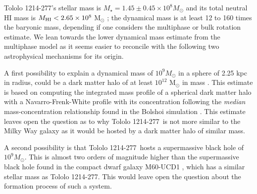 \documentclass[a4,useAMS,usenatbib,usegraphicx]{mn2e}
\newcommand{\tol}{Tololo 1214-277}
\newcommand{\kms}{km s$^{-1}$}
\begin{document}
\tol's stellar mass is  $M_{\star} = 1.45\pm0.45\times 10^{8}
M_{\odot}$   \citep{2014PASP..126.1079M} and its total neutral HI mass
is $M_{\rm HI}<2.65\times 10^{8}$ M$_{\odot}$ 
\citep{pustilnikmartin07}; the dynamical mass is at least 12 to 160 times
the baryonic mass, depending if one considers the multiphase or
bulk rotation estimate. 
We lean towards the lower dynamical mass estimate from the multiphase
model as it seems easier to reconcile with the following two
astrophysical mechanisms for its origin.

A first possibility to explain a dynamical mass of $10^{9} M_{\odot}$
in a sphere of 2.25 kpc in radius, could be a dark matter halo of at
least $10^{12}$ M$_{\odot}$ in mass \citep{2011ApJ...726..108T}.
This estimate is based on computing the integrated mass profile of a
spherical dark matter halo with a Navarro-Frenk-White profile with its
concentration following the \emph{median} mass-concentration
relationship found in the Bolshoi simulation
\citep{2012MNRAS.423.3018P}. 
This estimate leaves open the question as to why  \tol\ is not more
similar to the Milky Way galaxy as it would be hosted by a dark matter
halo of similar mass.

A second possibility is that \tol\ hosts a supermassive black hole of
$10^{9} M_{\odot}$. This is almost two orders of magnitude higher
than the supermassive black hole found in the compact dwarf galaxy
M60-UCD1 \citep{2014Natur.513..398S}, which has a similar stellar mass
as \tol. This would leave open the question about the formation
process of such a system.   

\end{document}
